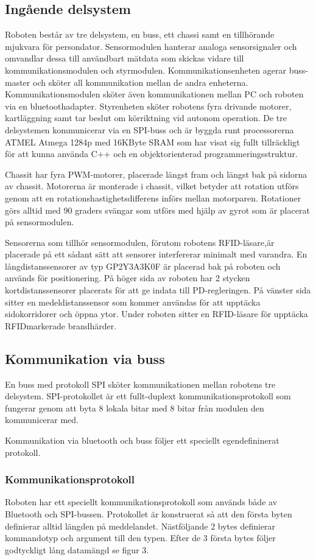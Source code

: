\documentclass[a4paper,12pt,fleqn]{article}
\begin{document}
\subsection{Ingående delsystem}
Roboten består av tre delsystem, en buss, ett chassi samt en tillhörande mjukvara för persondator. Sensormodulen hanterar analoga sensorsignaler och omvandlar dessa till användbart mätdata som skickas vidare till kommunikationsmodulen och styrmodulen. 
Kommunikationsenheten agerar buss-master och sköter all kommunikation mellan de andra enheterna. Kommunikationsmodulen sköter även kommunikationen mellan PC och roboten via en bluetoothadapter. Styrenheten sköter robotens fyra drivande motorer, kartläggning samt tar beslut om körriktning vid autonom operation.
De tre delsystemen kommunicerar via en SPI-buss och är byggda runt processorerna ATMEL Atmega 1284p med 16KByte SRAM som har visat sig fullt tillräckligt för att kunna använda C++ och en objektorienterad programmeringsstruktur.

Chassit har fyra PWM-motorer, placerade längst fram och längst bak på sidorna av chassit. Motorerna är monterade i chassit, vilket betyder att rotation utförs genom att en rotationshastighetsdifferens införs mellan motorparen. Rotationer görs alltid med 90 graders svängar som utförs med hjälp av gyrot som är placerat på sensormodulen. 

Sensorerna som tillhör sensormodulen, förutom robotens RFID-läsare,är placerade på ett sådant sätt att sensorer interfererar minimalt med varandra. En långdistanssensorer av typ GP\-2Y\-3A\-3K\-0F är placerad bak på roboten och används för positionering. På höger sida av roboten har 2 stycken kortdistanssensorer placerats för att ge indata till PD-regleringen. På vänster sida sitter en medeldistanssensor som kommer användas för att upptäcka sidokorridorer och öppna ytor.
Under roboten sitter en RFID-läsare för upptäcka RFIDmarkerade brandhärder.

\subsection{Kommunikation via buss}
En buss med protokoll SPI sköter kommunikationen mellan robotens tre delsystem. SPI-protokollet är ett fullt-duplext kommunikationsprotokoll som fungerar genom att byta 8 lokala bitar med 8 bitar från modulen den kommunicerar med. 

Kommunikation via bluetooth och buss följer ett speciellt egendefininerat protokoll. 

\subsubsection{Kommunikationsprotokoll}
Roboten har ett speciellt kommunikationsprotokoll som används både av Bluetooth och SPI-bussen. Protokollet är konstruerat så att den första byten definierar alltid längden på meddelandet. Nästföljande 2 bytes definierar kommandotyp och argument till den typen. Efter de 3 första bytes följer godtyckligt lång datamängd se figur 3.
\end{document}
